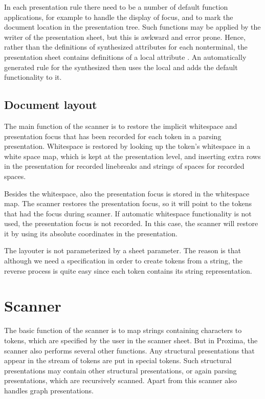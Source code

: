 \documentclass[12pt]{article}
\begin{document}
In each presentation rule there need to be a number of default function applications, for example to handle the display of focus, and to mark the document location in the presentation tree. Such functions may be applied by the writer of the presentation sheet, but this is awkward and error prone. Hence, rather than the definitions of synthesized attributes  for each nonterminal, the presentation sheet contains definitions of a local attribute . An automatically generated rule for the synthesized  then uses the local  and adds the default functionality to it.

\subsection{Document layout}

The main function of the scanner is to restore the implicit whitespace and presentation focus that has been recorded for each token in a parsing presentation. Whitespace is restored by looking up the token's whitespace in a white space map, which is kept at the presentation level, and inserting extra rows in the presentation for recorded linebreaks and strings of spaces for recorded spaces. 

Besides the whitespace, also the presentation focus is stored in the whitespace map. The scanner restores the presentation focus, so it will point to the tokens that had the focus during scanner. If automatic whitespace functionality is not used, the presentation focus is not recorded. In this case, the scanner will restore it by using its absolute coordinates in the presentation.

The layouter is not parameterized by a sheet parameter. The reason is that although we need a specification in order to create tokens from a string, the reverse process is quite easy since each token contains its string representation.  



%
\section{Scanner}
%

The basic function of the scanner is to map strings containing characters to tokens, which are specified by the user in the scanner sheet. But in Proxima, the scanner also performs several other functions. Any structural presentations that appear in the stream of tokens are put in special tokens. Such structural presentations may contain other structural presentations, or again parsing presentations, which are recursively scanned. Apart from this scanner also handles graph presentations. 
\end{document}
